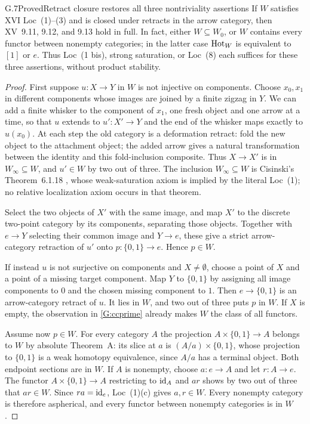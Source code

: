 \begin{claim}{G.7}{Proved}{Retract closure restores all three nontriviality assertions}
\label{G:retract-restoration}
If $W$ satisfies XVI Loc~(1)--(3) and is closed under retracts in the
arrow category, then XV~9.11, 9.12, and 9.13 hold in full.  In fact,
either $W\subseteq W_0$, or $W$ contains every functor between
nonempty categories; in the latter case $\operatorname{Hot}_W$ is equivalent to
$[1]$ or $e$.  Thus Loc~(1 bis), strong saturation, or Loc~(8) each
suffices for these three assertions, without product stability.
\end{claim}
\begin{proof}
First suppose $u:X\to Y$ in $W$ is not injective on components.
Choose $x_0,x_1$ in different components whose images are joined by
a finite zigzag in $Y$.  We can add a finite whisker to the component
of $x_1$, one fresh object and one arrow at a time, so that $u$ extends
to $u':X'\to Y$ and the end of the whisker maps exactly to $u(x_0)$.
At each step the old category is a deformation retract: fold the
new object to the attachment object; the added arrow gives a natural
transformation between the identity and this fold-inclusion composite.
Thus $X\to X'$ is in $W_\infty\subseteq W$, and $u'\in W$ by two
out of three.  The inclusion $W_\infty\subseteq W$ is Cisinski's
Theorem~6.1.18 \cite{GCisinski2006}, whose weak-saturation axiom is implied by the literal
Loc~(1); no relative localization axiom occurs in that theorem.

Select the two objects of $X'$ with the same image, and map $X'$ to
the discrete two-point category by its components, separating those
objects.  Together with $e\to Y$ selecting their common image and
$Y\to e$, these give a strict arrow-category retraction of $u'$
onto $p:\{0,1\}\to e$.  Hence $p\in W$.

If instead $u$ is not surjective on components and $X\ne\emptyset$,
choose a point of $X$ and a point of a missing target component.
Map $Y$ to $\{0,1\}$ by assigning all image components to $0$ and
the chosen missing component to $1$.  Then $e\to\{0,1\}$ is an
arrow-category retract of $u$.  It lies in $W$, and two out of three
puts $p$ in $W$.  If $X$ is empty, the observation in
\ref{G:ccprime} already makes $W$ the class of all functors.

Assume now $p\in W$.  For every category $A$ the projection
$A\times\{0,1\}\to A$ belongs to $W$ by absolute Theorem~A:
its slice at $a$ is $(A/a)\times\{0,1\}$, whose projection to
$\{0,1\}$ is a weak homotopy equivalence, since $A/a$ has a terminal
object.  Both endpoint sections are in $W$.  If $A$ is nonempty,
choose $a:e\to A$ and let $r:A\to e$.  The functor
$A\times\{0,1\}\to A$ restricting to $\mathrm{id}_A$ and $ar$ shows by
two out of three that $ar\in W$.  Since $ra=\mathrm{id}_e$, Loc~(1)(c)
gives $a,r\in W$.  Every nonempty category is therefore aspherical,
and every functor between nonempty categories is in $W$.


\end{proof}
